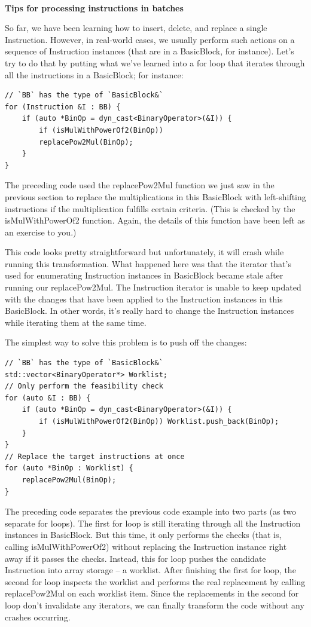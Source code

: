 \hspace*{\fill} \\ %
\noindent
\textbf{Tips for processing instructions in batches}

So far, we have been learning how to insert, delete, and replace a single Instruction. However, in real-world cases, we usually perform such actions on a sequence of Instruction instances (that are in a BasicBlock, for instance). Let's try to do that by putting what we've learned into a for loop that iterates through all the instructions in a BasicBlock; for instance:

\begin{lstlisting}[style=styleCXX]
// `BB` has the type of `BasicBlock&`
for (Instruction &I : BB) {
	if (auto *BinOp = dyn_cast<BinaryOperator>(&I)) {
		if (isMulWithPowerOf2(BinOp))
		replacePow2Mul(BinOp);
	}
}
\end{lstlisting}

The preceding code used the replacePow2Mul function we just saw in the previous section to replace the multiplications in this BasicBlock with left-shifting instructions if the multiplication fulfills certain criteria. (This is checked by the isMulWithPowerOf2 function. Again, the details of this function have been left as an exercise to you.)

This code looks pretty straightforward but unfortunately, it will crash while running this transformation. What happened here was that the iterator that's used for enumerating Instruction instances in BasicBlock became stale after running our replacePow2Mul. The Instruction iterator is unable to keep updated with the changes that have been applied to the Instruction instances in this BasicBlock. In other words, it's really hard to change the Instruction instances while iterating them at the same time.

The simplest way to solve this problem is to push off the changes:

\begin{lstlisting}[style=styleCXX]
// `BB` has the type of `BasicBlock&`
std::vector<BinaryOperator*> Worklist;
// Only perform the feasibility check
for (auto &I : BB) {
	if (auto *BinOp = dyn_cast<BinaryOperator>(&I)) {
		if (isMulWithPowerOf2(BinOp)) Worklist.push_back(BinOp);
	}
}
// Replace the target instructions at once
for (auto *BinOp : Worklist) {
	replacePow2Mul(BinOp);
}
\end{lstlisting}

The preceding code separates the previous code example into two parts (as two separate for loops). The first for loop is still iterating through all the Instruction instances in BasicBlock. But this time, it only performs the checks (that is, calling isMulWithPowerOf2) without replacing the Instruction instance right away if it passes the checks. Instead, this for loop pushes the candidate Instruction into array storage – a worklist. After finishing the first for loop, the second for loop inspects the worklist and performs the real replacement by calling replacePow2Mul on each worklist item. Since the replacements in the second for loop don't invalidate any iterators, we can finally transform the code without any crashes occurring.

